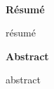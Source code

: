 \newpage
~
\vfill
\begin{center}
\textbf{Résumé}
\end{center}
\noindent résumé

\vspace{1cm}

\begin{center}
\textbf{Abstract}
\end{center}

\noindent abstract
\vfill

